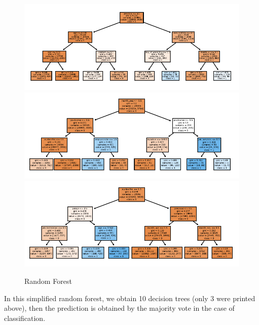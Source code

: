 \documentclass[11pt,a4paper]{article}
\begin{document}
    \begin{figure}[!ht]
        \centering
        \includegraphics[width = \textwidth]{plot/classification/random_forest0.pdf}
        \includegraphics[width = \textwidth]{plot/classification/random_forest1.pdf}
        \includegraphics[width = \textwidth]{plot/classification/random_forest2.pdf}
        \caption{Random Forest}
        \label{fig:random_forest}
    \end{figure}
    
    \newpage
    \noindent
    In this simplified random forest, we obtain 10 decision trees (only 3 were printed above), then the prediction is obtained by the majority vote in the case of classification.
    
    
\end{document}
